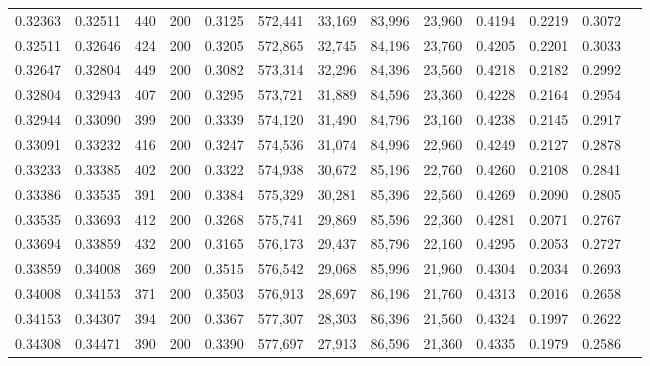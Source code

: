\begin{tabular}{rrrrrrrrrrrrr}
0.32363 & 0.32511 &   440 & 200 &                                     0.3125 & 572,441 &  33,169 &  83,996 &  23,960 & 0.4194 & 0.2219 & 0.3072 \\
0.32511 & 0.32646 &   424 & 200 &                                     0.3205 & 572,865 &  32,745 &  84,196 &  23,760 & 0.4205 & 0.2201 & 0.3033 \\
0.32647 & 0.32804 &   449 & 200 &                                     0.3082 & 573,314 &  32,296 &  84,396 &  23,560 & 0.4218 & 0.2182 & 0.2992 \\
0.32804 & 0.32943 &   407 & 200 &                                     0.3295 & 573,721 &  31,889 &  84,596 &  23,360 & 0.4228 & 0.2164 & 0.2954 \\
0.32944 & 0.33090 &   399 & 200 &                                     0.3339 & 574,120 &  31,490 &  84,796 &  23,160 & 0.4238 & 0.2145 & 0.2917 \\
0.33091 & 0.33232 &   416 & 200 &                                     0.3247 & 574,536 &  31,074 &  84,996 &  22,960 & 0.4249 & 0.2127 & 0.2878 \\
0.33233 & 0.33385 &   402 & 200 &                                     0.3322 & 574,938 &  30,672 &  85,196 &  22,760 & 0.4260 & 0.2108 & 0.2841 \\
0.33386 & 0.33535 &   391 & 200 &                                     0.3384 & 575,329 &  30,281 &  85,396 &  22,560 & 0.4269 & 0.2090 & 0.2805 \\
0.33535 & 0.33693 &   412 & 200 &                                     0.3268 & 575,741 &  29,869 &  85,596 &  22,360 & 0.4281 & 0.2071 & 0.2767 \\
0.33694 & 0.33859 &   432 & 200 &                                     0.3165 & 576,173 &  29,437 &  85,796 &  22,160 & 0.4295 & 0.2053 & 0.2727 \\
0.33859 & 0.34008 &   369 & 200 &                                     0.3515 & 576,542 &  29,068 &  85,996 &  21,960 & 0.4304 & 0.2034 & 0.2693 \\
0.34008 & 0.34153 &   371 & 200 &                                     0.3503 & 576,913 &  28,697 &  86,196 &  21,760 & 0.4313 & 0.2016 & 0.2658 \\
0.34153 & 0.34307 &   394 & 200 &                                     0.3367 & 577,307 &  28,303 &  86,396 &  21,560 & 0.4324 & 0.1997 & 0.2622 \\
0.34308 & 0.34471 &   390 & 200 &                                     0.3390 & 577,697 &  27,913 &  86,596 &  21,360 & 0.4335 & 0.1979 & 0.2586 \\

\end{tabular}
